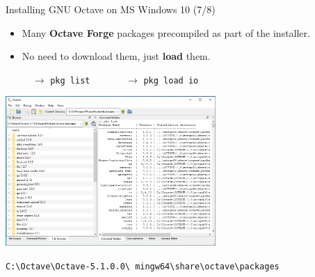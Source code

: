 \begin{frame}{Installing GNU Octave on MS Windows 10 (7/8)}
\begin{itemize}
\item
Many \textbf{\color{DarkBlue}Octave Forge} packages precompiled
as part of the installer.
\item
No need to download them, just \textbf{load} them.

$\quad\rightarrow$ \texttt{pkg list}
$\qquad\quad\;\rightarrow$ \texttt{pkg load io}
\end{itemize}
\begin{center}
\includegraphics[width=0.6\textwidth]{res/ms_windows/win_octave_packages.png}
\end{center}
\vspace*{-0.8em}
\texttt{C:\textbackslash Octave\textbackslash Octave-5.1.0.0\textbackslash
  mingw64\textbackslash share\textbackslash octave\textbackslash packages}
\end{frame}



